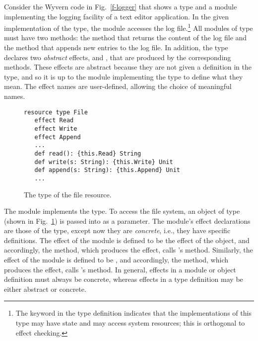 Consider the Wyvern code in Fig.~\ref{f-logger} that shows a type and a module implementing the logging facility of a text editor application.  In the given implementation of the  type, the  module accesses the log file.\footnote{The keyword  in the type definition indicates that the implementations of this type may have state and may access system resources; this is orthogonal to effect checking.} All modules of type  must have two methods: the  method that returns the content of the log file and the  method that appends new entries to the log file. In addition, the  type declares two \textit{abstract} effects,  and , that are produced by the corresponding methods. These effects are abstract because they are not given a definition in the  type, and so it is up to the module implementing the  type to define what they mean. The effect names are user-defined, allowing the choice of meaningful names.

\begin{figure}[t]
\begin{lstlisting}[language=wyvern]  
resource type File
   effect Read
   effect Write
   effect Append
   ...
   def read(): {this.Read} String
   def write(s: String): {this.Write} Unit
   def append(s: String): {this.Append} Unit
   ...
\end{lstlisting}
\caption{The type of the file resource.}
\label{f-file}
\end{figure}

The  module implements the  type. To access the file system, an object of type  (shown in Fig.~\ref{f-file}) is passed into  as a parameter. The  module's effect declarations are those of the  type, except now they are \textit{concrete}, i.e., they have specific definitions. The  effect of the  module is defined to be the  effect of the  object, and accordingly, the  method, which produces the  effect, calls 's  method. Similarly, the  effect of the  module is defined to be , and accordingly, the  method, which produces the  effect, calls 's  method. In general, effects in a module or object definition must always be concrete, whereas effects in a type definition may be either abstract or concrete.


